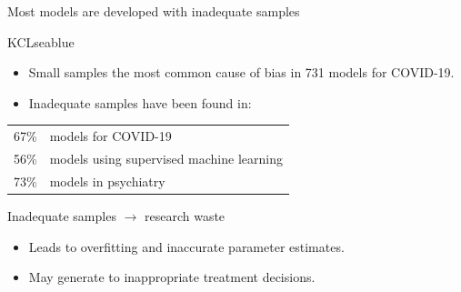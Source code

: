\documentclass[11pt]{beamer}
\newcommand*{\tc}[2]{%
    \textcolor{#1}{#2}
}
\newcommand{\sgap}{\vspace{0.5em}}
\begin{document}
\begin{frame}[t]{Most models are developed with inadequate samples}



	\begin{cbox}[bottom=0.5mm]{KCLseablue}{}
		\begin{itemize}
			\item Small samples the most common cause of bias in 731 models
			      for COVID-19.\autocite{wynants2020}
			\item Inadequate samples have been found in: \vspace{0.5em}
		\end{itemize}
		\begin{tabular}{cl}
			{\LARGE \alert{67\%}} & models for COVID-19\autocite{wynants2020}                      \\[0.2em]
			{\LARGE \alert{56\%}} & models using supervised machine learning\autocite{navarro2021} \\[0.2em]
			{\LARGE \alert{73\%}} & models in psychiatry\autocite{meehan2022}
		\end{tabular}
	\end{cbox}


	\vspace{0.3em}
	{\Large \tc{KCLseablue}{Inadequate samples $\rightarrow$ research waste}}
	\sgap

	\begin{itemize}
		\item Leads to overfitting and inaccurate parameter estimates.


		\item May generate to inappropriate treatment decisions.


\end{itemize}
\end{frame}
\end{document}
